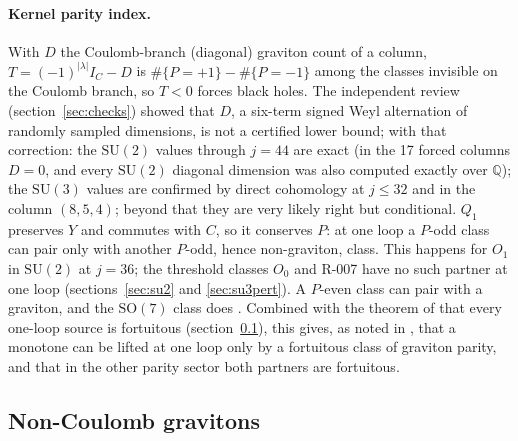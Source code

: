 \documentclass[11pt]{article}
\newcommand{\SU}{\mathrm{SU}}
\newcommand{\SO}{\mathrm{SO}}
\begin{document}
\paragraph{Kernel parity index.} With $D$ the Coulomb-branch (diagonal) graviton count of a column,
$T=(-1)^{|\lambda|}I_C-D$ is $\#\{P=+1\}-\#\{P=-1\}$ among the classes invisible on the Coulomb branch, so $T<0$ forces
black holes. The independent review (section~\ref{sec:checks}) showed that $D$, a six-term signed Weyl alternation of
randomly sampled dimensions, is not a certified lower bound; with that correction: the $\SU(2)$ values through $j=44$
are exact (in the 17 forced columns $D=0$, and every $\SU(2)$ diagonal dimension was also computed exactly over
$\mathbb Q$); the $\SU(3)$ values are confirmed by direct cohomology at $j\le32$ and in the column $(8,5,4)$; beyond
that they are very likely right but conditional. $Q_1$ preserves $Y$ and commutes with $C$, so it conserves $P$: at one
loop a $P$-odd class can pair only with another $P$-odd, hence non-graviton, class. This happens for $O_1$ in $\SU(2)$
at $j=36$; the threshold classes $O_0$ and R-007 have no such partner at one loop (sections~\ref{sec:su2} and
\ref{sec:su3pert}). A $P$-even class can pair with a graviton, and the $\SO(7)$ class does \cite{ChoiLee}. Combined
with the theorem of \cite[eq.~(6.7)]{KVM} that every one-loop source is fortuitous (section~\ref{sec:noncoulomb}),
this gives, as noted in \cite[sec.~7]{KVM}, that a monotone can be lifted at one loop only by a fortuitous class of graviton parity, and that in the
other parity sector both partners are fortuitous.

\subsection{Non-Coulomb gravitons}\label{sec:noncoulomb}
\end{document}
